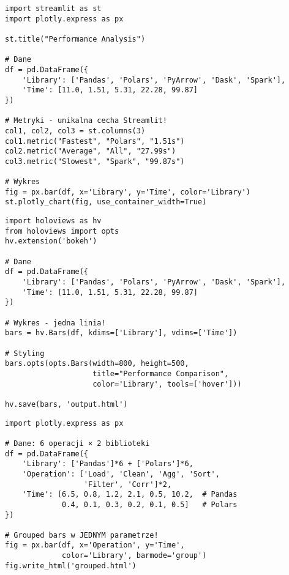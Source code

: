 
\begin{lstlisting}[caption={Streamlit - Interaktywny dashboard (15 LOC)},label={lst:streamlit_simple}]
import streamlit as st
import plotly.express as px

st.title("Performance Analysis")

# Dane
df = pd.DataFrame({
    'Library': ['Pandas', 'Polars', 'PyArrow', 'Dask', 'Spark'],
    'Time': [11.0, 1.51, 5.31, 22.28, 99.87]
})

# Metryki - unikalna cecha Streamlit!
col1, col2, col3 = st.columns(3)
col1.metric("Fastest", "Polars", "1.51s")
col2.metric("Average", "All", "27.99s")
col3.metric("Slowest", "Spark", "99.87s")

# Wykres
fig = px.bar(df, x='Library', y='Time', color='Library')
st.plotly_chart(fig, use_container_width=True)
\end{lstlisting}



\begin{lstlisting}[caption={Holoviews - Czysty kod (12 LOC)},label={lst:holoviews_simple}]
import holoviews as hv
from holoviews import opts
hv.extension('bokeh')

# Dane
df = pd.DataFrame({
    'Library': ['Pandas', 'Polars', 'PyArrow', 'Dask', 'Spark'],
    'Time': [11.0, 1.51, 5.31, 22.28, 99.87]
})

# Wykres - jedna linia!
bars = hv.Bars(df, kdims=['Library'], vdims=['Time'])

# Styling
bars.opts(opts.Bars(width=800, height=500, 
                    title="Performance Comparison",
                    color='Library', tools=['hover']))

hv.save(bars, 'output.html')
\end{lstlisting}



\begin{lstlisting}[caption={Plotly - Grouped bars automatycznie (10 LOC)},label={lst:plotly_grouped}]
import plotly.express as px

# Dane: 6 operacji × 2 biblioteki
df = pd.DataFrame({
    'Library': ['Pandas']*6 + ['Polars']*6,
    'Operation': ['Load', 'Clean', 'Agg', 'Sort', 
                  'Filter', 'Corr']*2,
    'Time': [6.5, 0.8, 1.2, 2.1, 0.5, 10.2,  # Pandas
             0.4, 0.1, 0.3, 0.2, 0.1, 0.5]   # Polars
})

# Grouped bars w JEDNYM parametrze!
fig = px.bar(df, x='Operation', y='Time', 
             color='Library', barmode='group')
fig.write_html('grouped.html')
\end{lstlisting}

